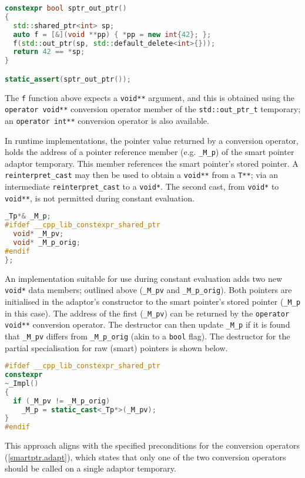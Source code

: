 \documentclass[10pt]{article}
\newcommand*{\wgxxi}[1]{[\href{https://wg21.link/#1}{#1}]}
\begin{document}
\begin{lstlisting}[language=cpp]
constexpr bool sptr_out_ptr()
{
  std::shared_ptr<int> sp;
  auto f = [&](void **pp) { *pp = new int{42}; };
  f(std::out_ptr(sp, std::default_delete<int>{}));
  return 42 == *sp;
}

static_assert(sptr_out_ptr());
\end{lstlisting}

The \texttt{f} function above expects a \texttt{void**} argument, and this is
obtained using the \texttt{operator void**} conversion operator member of the
\texttt{std::out\_ptr\_t} temporary; an \texttt{operator int**}
conversion operator is also available.

In runtime implementations, the pointer value returned by a conversion
operator, holds the address of a pointer reference member (e.g.
\texttt{\_M\_p}) of the smart pointer adaptor temporary. This member references
the smart pointer's stored pointer. A \texttt{reinterpret\_cast} may then be
used to obtain a \texttt{void**} from a \texttt{T**}; via an intermediate
\texttt{reinterpret\_cast} to a \texttt{void*}. The second cast, from
\texttt{void*} to \texttt{void**}, is not permitted during constant evaluation.

\begin{lstlisting}[language=cpp]
  _Tp*& _M_p;
#ifdef __cpp_lib_constexpr_shared_ptr
  void* _M_pv;
  void* _M_p_orig;
#endif
};
\end{lstlisting}

An implementation suitable for use during constant evaluation adds two
new \texttt{void*} data members; outlined above (\texttt{\_M\_pv} and
\texttt{\_M\_p\_orig}). Both pointers are initialised in the adaptor's
constructor to the smart pointer's stored pointer (\texttt{\_M\_p} in this
case). The address of the first (\texttt{\_M\_pv}) can be returned by the
\texttt{operator void**} conversion operator. The destructor can then update
\texttt{\_M\_p} if it is found that \texttt{\_M\_pv} differs from
\texttt{\_M\_p\_orig} (akin to a \texttt{bool} flag). The destructor for the
partial specialisation for raw (smart) pointers is shown below.

\begin{lstlisting}[language=cpp]
#ifdef __cpp_lib_constexpr_shared_ptr
constexpr
~_Impl()
{
  if (_M_pv != _M_p_orig)
    _M_p = static_cast<_Tp*>(_M_pv);
}
#endif
\end{lstlisting}

This approach aligns with the specified preconditions for the conversion
operators (\wgxxi{smartptr.adapt}), which states that only one of the two
conversion operators should be called on a single adaptor temporary.
\end{document}

